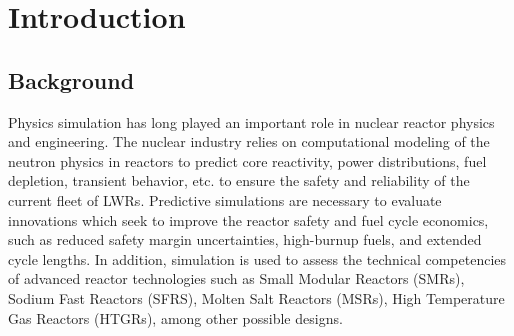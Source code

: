 \chapter{Introduction}
\label{chap:intro}

\section{Background}
\label{sec:chap1-background}


Physics simulation has long played an important role in nuclear reactor physics and engineering. The nuclear industry relies on computational modeling of the neutron physics in reactors to predict core reactivity, power distributions, fuel depletion, transient behavior, etc. to ensure the safety and reliability of the current fleet of \ac{LWRs}. Predictive simulations are necessary to evaluate innovations which seek to improve the reactor safety and fuel cycle economics, such as reduced safety margin uncertainties, high-burnup fuels, and extended cycle lengths. In addition, simulation is used to assess the technical competencies of advanced reactor technologies such as Small Modular Reactors (SMRs), Sodium Fast Reactors (SFRS), Molten Salt Reactors (MSRs), High Temperature Gas Reactors (HTGRs), among other possible designs. 

